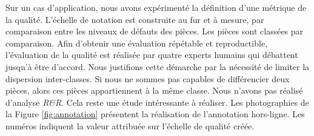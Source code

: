 Sur un cas d'application, nous avons expérimenté la définition d'une métrique de la qualité.
L'échelle de notation est construite au fur et à mesure, par comparaison entre les niveaux de défauts des pièces.
Les pièces sont classées par comparaison.
Afin d'obtenir une évaluation répétable et reproductible, l'évaluation de la qualité est réalisée par quatre experts humains qui débattent jusqu'à être d'accord.
Nous justifions cette démarche par la nécessité de limiter la dispersion inter-classes.
Si nous ne sommes pas capables de différencier deux pièces, alors ces pièces appartiennent à la même classe.
Nous n'avons pas réalisé d'analyse \textit{R\&R}.
Cela reste une étude intéressante à réaliser.
Les photographies de la Figure \ref{fig:annotation} présentent la réalisation de l'annotation hors-ligne.
Les numéros indiquent la valeur attribuée sur l'échelle de qualité créée.

